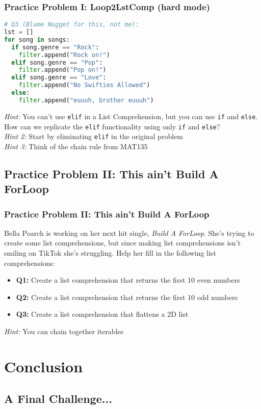 \documentclass[hyperref={colorlinks,citecolor=blue,linkcolor=blue,urlcolor=blue}]{beamer}
\begin{document}
\begin{frame}[fragile]
  \frametitle{Practice Problem I: Loop2LstComp (hard mode)}
  \begin{lstlisting}[language=Python, style=mystyle]
# Q3 (Blame Nugget for this, not me):
lst = []
for song in songs:
  if song.genre == "Rock":
    filter.append("Rock on!")
  elif song.genre == "Pop":
    filter.append("Pop on!")
  elif song.genre == "Love":
    filter.append("No Swifties Allowed")
  else:
    filter.append("euuuh, brother euuuh")
    \end{lstlisting}
\textit{Hint:} You can't use \texttt{elif} in a List Comprehension, but you can use \texttt{if} and \texttt{else}. How can we replicate the \texttt{elif} functionality using only \texttt{if} and \texttt{else}?\\
\textit{Hint 2:} Start by eliminating \texttt{elif} in the original problem\\
\textit{Hint 3:} Think of the chain rule from MAT135
\end{frame}



\subsection{Practice Problem II: This ain't Build A ForLoop}
\begin{frame}
  \frametitle{Practice Problem II: This ain't Build A ForLoop}
  Bella Poarch is working on her next hit single, \textit{Build A ForLoop}. She's trying to create some list comprehensions, but since making list comprehensions isn't smiling on TikTok she's struggling. Help her fill in the following list comprehensions:
  
  \begin{itemize}
    \item \textbf{Q1:} Create a list comprehension that returns the first 10 even numbers
    \item \textbf{Q2:} Create a list comprehension that returns the first 10 odd numbers
    \item \textbf{Q3:} Create a list comprehension that flattens a 2D list
  \end{itemize}
  \textit{Hint:} You can chain together iterables
\end{frame}

\section{Conclusion}
\subsection{A Final Challenge...}
\end{document}
